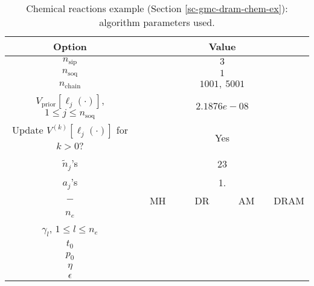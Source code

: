 \begin{table}[h!]
\begin{center}
\begin{tabular}{|c|c|c|c|c|}
\hline
Option                                            & \multicolumn{4}{c|}{Value}                                   \\
\hline
\hline
$n_{\text{sip}}$                                  & \multicolumn{4}{c|}{$3$}                                     \\
\hline
$n_{\text{soq}}$                                  & \multicolumn{4}{c|}{$1$}                                     \\
\hline
$n_{\text{chain}}$                                & \multicolumn{4}{c|}{$1001,~5001$}                            \\
\hline
\hline
$V_{\text{prior}}[\ell_j(\cdot)]$,
$1\leqslant j\leqslant n_{\text{soq}}$            & \multicolumn{4}{c|}{$2.1876e-08$}                            \\
\hline
Update $V^{(k)}[\ell_j(\cdot)]$ for $k>0$?        & \multicolumn{4}{c|}{Yes}                                     \\
\hline
${\tilde{n}}_j$'s                                 & \multicolumn{4}{c|}{23}                                      \\
\hline
$a_j$'s                                           & \multicolumn{4}{c|}{1.}                                      \\
\hline
\hline
$-$                                               & ~~MH~~            & ~~DR~~       & ~~AM~~       & DRAM       \\
\hline
$n_e$                                             &                   &              &              &            \\
\hline
$\gamma_l$,
$1\leqslant l\leqslant n_e$                       &                   &              &              &            \\
\hline
\hline
$t_0$                                             &                   &              &              &            \\
\hline
$p_0$                                             &                   &              &              &            \\
\hline
$\eta$                                            &                   &              &              &            \\
\hline
$\epsilon$                                        &                   &              &              &            \\
\hline
\end{tabular}
\caption{Chemical reactions example (Section \ref{sc-gmc-dram-chem-ex}):
algorithm parameters used.
}
\label{tab-dram-chem-ex-alg-params}
\end{center}
\end{table}

